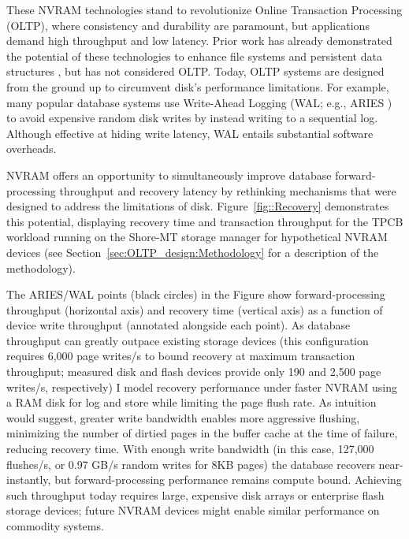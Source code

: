 These NVRAM technologies stand to revolutionize Online Transaction Processing (OLTP), where consistency and durability are paramount, but applications demand high throughput and low latency.
Prior work has already demonstrated the potential of these technologies to enhance file systems \cite{GreenanMiller06, ConditNightingale09} and persistent data structures \cite{VenkataramanTolia11}, but has not considered OLTP. 
Today, OLTP systems are designed from the ground up to circumvent disk's performance limitations.
For example, many popular database systems use Write-Ahead Logging (WAL; e.g., ARIES \cite{MohanHaderle92}) to avoid expensive random disk writes by instead writing to a sequential log.  
Although effective at hiding write latency, WAL entails substantial software overheads.

NVRAM offers an opportunity to simultaneously improve database forward-processing throughput and recovery latency by rethinking mechanisms that were designed to address the limitations of disk.
Figure~\ref{fig::Recovery} demonstrates this potential, displaying recovery time and transaction throughput for the TPCB workload running on the Shore-MT storage manager \cite{JohnsonPandis09} for hypothetical NVRAM devices (see Section~\ref{sec:OLTP_design:Methodology} for a description of the methodology).



The ARIES/WAL points (black circles) in the Figure show forward-processing throughput (horizontal axis) and recovery time (vertical axis) as a function of device write throughput (annotated alongside each point).
As database throughput can greatly outpace existing storage devices (this configuration requires 6,000 page writes/s to bound recovery at maximum transaction throughput; measured disk and flash devices provide only 190 and 2,500 page writes/s, respectively) I model recovery performance under faster NVRAM using a RAM disk for log and store while limiting the page flush rate.
As intuition would suggest, greater write bandwidth enables more aggressive flushing, minimizing the number of dirtied pages in the buffer cache at the time of failure, reducing recovery time.
With enough write bandwidth (in this case, 127,000 flushes/s, or 0.97 GB/s random writes for 8KB pages) the database recovers near-instantly, but forward-processing performance remains compute bound.
Achieving such throughput today requires large, expensive disk arrays or enterprise flash storage devices; future NVRAM devices might enable similar performance on commodity systems.

